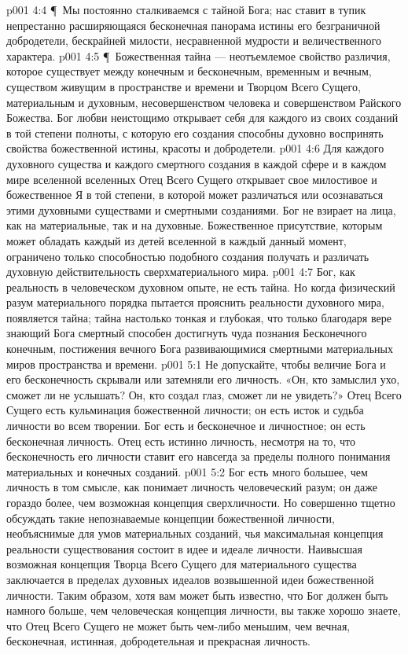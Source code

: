 \vs p001 4:4 \P\ Мы постоянно сталкиваемся с тайной Бога; нас ставит в тупик непрестанно расширяющаяся бесконечная панорама истины его безграничной добродетели, бескрайней милости, несравненной мудрости и величественного характера.
\vs p001 4:5 \P\ Божественная тайна --- неотъемлемое свойство различия, которое существует между конечным и бесконечным, временным и вечным, существом живущим в пространстве и времени и Творцом Всего Сущего, материальным и духовным, несовершенством человека и совершенством Райского Божества. Бог любви неистощимо открывает себя для каждого из своих созданий в той степени полноты, с которую его создания способны духовно воспринять свойства божественной истины, красоты и добродетели.
\vs p001 4:6 Для каждого духовного существа и каждого смертного создания в каждой сфере и в каждом мире вселенной вселенных Отец Всего Сущего открывает свое милостивое и божественное Я в той степени, в которой может различаться или осознаваться этими духовными существами и смертными созданиями. Бог не взирает на лица, как на материальные, так и на духовные. Божественное присутствие, которым может обладать каждый из детей вселенной в каждый данный момент, ограничено только способностью подобного создания получать и различать духовную действительность сверхматериального мира.
\vs p001 4:7 Бог, как реальность в человеческом духовном опыте, не есть тайна. Но когда физический разум материального порядка пытается прояснить реальности духовного мира, появляется тайна; тайна настолько тонкая и глубокая, что только благодаря вере знающий Бога смертный способен достигнуть чуда познания Бесконечного конечным, постижения вечного Бога развивающимися смертными материальных миров пространства и времени.
\vs p001 5:1 Не допускайте, чтобы величие Бога и его бесконечность скрывали или затемняли его личность. «Он, кто замыслил ухо, сможет ли не услышать? Он, кто создал глаз, сможет ли не увидеть?» Отец Всего Сущего есть кульминация божественной личности; он есть исток и судьба личности во всем творении. Бог есть и бесконечное и личностное; он есть бесконечная личность. Отец есть истинно личность, несмотря на то, что бесконечность его личности ставит его навсегда за пределы полного понимания материальных и конечных созданий.
\vs p001 5:2 Бог есть много большее, чем личность в том смысле, как понимает личность человеческий разум; он даже гораздо более, чем возможная концепция сверхличности. Но совершенно тщетно обсуждать такие непознаваемые концепции божественной личности, необъяснимые для умов материальных созданий, чья максимальная концепция реальности существования состоит в идее и идеале личности. Наивысшая возможная концепция Творца Всего Сущего для материального существа заключается в пределах духовных идеалов возвышенной идеи божественной личности. Таким образом, хотя вам может быть известно, что Бог должен быть намного больше, чем человеческая концепция личности, вы также хорошо знаете, что Отец Всего Сущего не может быть чем\hyp{}либо меньшим, чем вечная, бесконечная, истинная, добродетельная и прекрасная личность.
